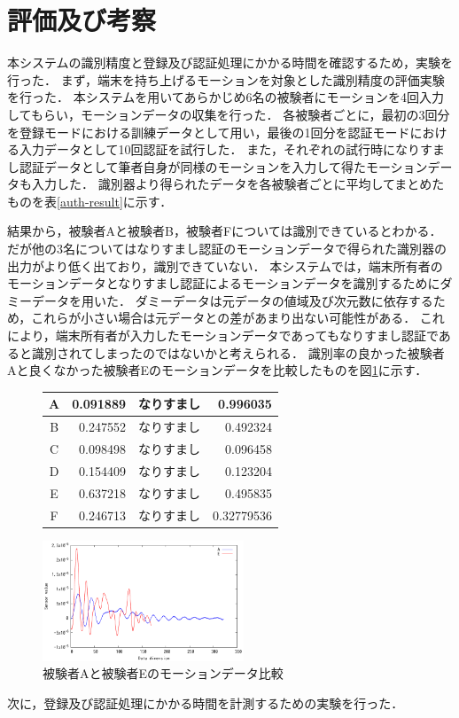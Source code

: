 \section{評価及び考察}
本システムの識別精度と登録及び認証処理にかかる時間を確認するため，実験を行った．
まず，端末を持ち上げるモーションを対象とした識別精度の評価実験を行った．
本システムを用いてあらかじめ6名の被験者にモーションを4回入力してもらい，モーションデータの収集を行った．
各被験者ごとに，最初の3回分を登録モードにおける訓練データとして用い，最後の1回分を認証モードにおける入力データとして10回認証を試行した．
また，それぞれの試行時になりすまし認証データとして筆者自身が同様のモーションを入力して得たモーションデータも入力した．
識別器より得られたデータを各被験者ごとに平均してまとめたものを表\ref{auth-result}に示す．

結果から，被験者Aと被験者B，被験者Fについては識別できているとわかる．
だが他の3名についてはなりすまし認証のモーションデータで得られた識別器の出力がより低く出ており，識別できていない．
本システムでは，端末所有者のモーションデータとなりすまし認証によるモーションデータを識別するためにダミーデータを用いた．
ダミーデータは元データの値域及び次元数に依存するため，これらが小さい場合は元データとの差があまり出ない可能性がある．
これにより，端末所有者が入力したモーションデータであってもなりすまし認証であると識別されてしまったのではないかと考えられる．
識別率の良かった被験者Aと良くなかった被験者Eのモーションデータを比較したものを図\ref{compare}に示す．

\begin{figure}[tbhp]
  \def\@captype{table}
  \begin{minipage}[t]{.48\textwidth}
    \centering
    \label{auth-result}
    \begin{tabular}{|c|r||c|r|} \hline
      A & 0.091889 & なりすまし & 0.996035 \\ \hline
      B & 0.247552 & なりすまし & 0.492324 \\ \hline
      C & 0.098498 & なりすまし & 0.096458 \\ \hline
      D & 0.154409 & なりすまし & 0.123204 \\ \hline
      E & 0.637218 & なりすまし & 0.495835 \\ \hline
      F & 0.246713 & なりすまし & 0.32779536 \\ \hline
    \end{tabular}
  \end{minipage}
  \hfill
  \begin{minipage}[c]{.48\textwidth}
    \centering
    \includegraphics[bb=0 0 360 216, width=6cm]{Graphs/comp.pdf}
    \caption{被験者Aと被験者Eのモーションデータ比較}
    \label{compare}
  \end{minipage}
\end{figure}


次に，登録及び認証処理にかかる時間を計測するための実験を行った．
